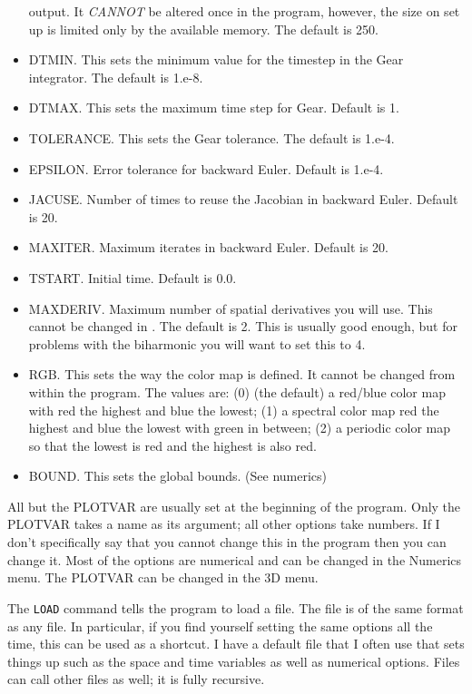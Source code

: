 \begin{itemize}
output.  It {\em CANNOT} be altered once in the program, however, the
size on set up is limited only by the available memory.  The default
is 250.
\item DTMIN. This sets the minimum value for the timestep in the Gear
integrator. The default is 1.e-8.
\item DTMAX. This sets the maximum time step for Gear. Default is 1.
\item TOLERANCE. This sets the Gear tolerance.  The default is 1.e-4.
\item EPSILON. Error tolerance for backward Euler. Default is 1.e-4.
\item JACUSE. Number of times to reuse the Jacobian in backward Euler.
Default is 20.
\item MAXITER. Maximum iterates in backward Euler. Default is 20. 
\item TSTART. Initial time. Default is 0.0.
\item MAXDERIV.  Maximum number of spatial derivatives you will use.
This cannot be changed in \xtc.  The default is 2.  This is usually
good enough, but for problems with the biharmonic you will want to set
this to 4.
\item RGB. This sets the way the color map is defined. It cannot be
changed from within the program.  The values are: (0) (the default) a
red/blue color map with red the highest and blue the lowest; (1) a
spectral color map red the highest and blue the lowest with green in
between; (2) a periodic color map so that the lowest is red and the
highest is also red.
\item BOUND.  This sets the global bounds. (See numerics)
\end{itemize}
All but the PLOTVAR are usually set at the beginning of the program.
Only the PLOTVAR takes a name as its argument; all other options take
numbers. If I don't specifically say that you cannot change this in
the program then you can change it.  Most of the options are numerical
and can be changed in the Numerics menu.  The PLOTVAR can be changed
in the 3D menu.

\vspace{.25 in}

The {\tt LOAD} command tells the program to load a file.  The file is
of the same format as any \xtc file.  In particular, if you find
yourself setting the same options all the time, this can be used as a
shortcut. I have a default file that I often use that sets things up
such as the space and time variables as well as numerical options.
Files can call other files as well; it is fully recursive.

